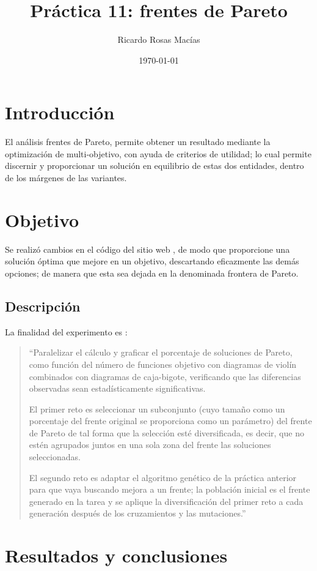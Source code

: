 \documentclass[12pt, letterpaper] {article}
\author{Ricardo Rosas Macías}
\title{Práctica 11: frentes de Pareto}
\date{\today}
\begin{document}
\maketitle


\section{Introducción}
El análisis frentes de Pareto, permite obtener un resultado mediante la optimización de multi-objetivo, con ayuda de criterios de utilidad; lo cual permite discernir y proporcionar un solución en equilibrio de estas dos entidades, dentro de los márgenes de las variantes. 

 \section{Objetivo}
Se realizó cambios en el c\'odigo del sitio web \cite{elisaweb}, de modo que proporcione una solución óptima que mejore en un objetivo, descartando eficazmente las demás opciones; de manera que esta sea dejada en la denominada frontera de Pareto.

 
 \subsection{Descripción}
 
La finalidad del experimento es \cite{elisaweb}:
\begin{quotation}
 ``Paralelizar el cálculo y graficar el porcentaje de soluciones de Pareto, como función del número de funciones objetivo con diagramas de violín combinados con diagramas de caja-bigote, verificando que las diferencias observadas sean estadísticamente significativas.

El primer reto es seleccionar un subconjunto (cuyo tamaño como un porcentaje del frente original se proporciona como un parámetro) del frente de Pareto de tal forma que la selección esté diversificada, es decir, que no estén agrupados juntos en una sola zona del frente las soluciones seleccionadas. 

El segundo reto es adaptar el algoritmo genético de la práctica anterior para que vaya buscando mejora a un frente; la población inicial es el frente generado en la tarea y se aplique la diversificación del primer reto a cada generación después de los cruzamientos y las mutaciones.''
\end{quotation}

\section{Resultados y conclusiones}
\end{document}
